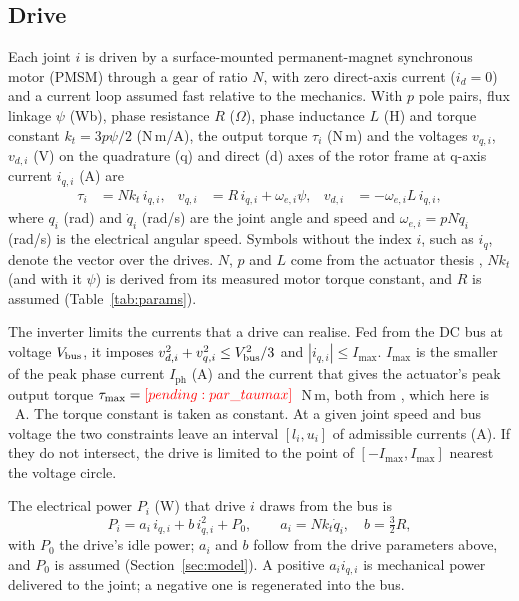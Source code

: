 \subsection{Drive}\label{sec:drive}
Each joint $i$ is driven by a surface-mounted permanent-magnet synchronous motor (PMSM) through a gear of ratio $N$, with zero direct-axis current ($i_d=0$) and a current loop assumed fast relative to the mechanics. With $p$ pole pairs, flux linkage $\psi$ (Wb), phase resistance $R$ ($\Omega$), phase inductance $L$ (H) and torque constant $k_t = 3p\psi/2$ (N\,m/A), the output torque $\tau_i$ (N\,m) and the voltages $v_{q,i}$, $v_{d,i}$ (V) on the quadrature (q) and direct (d) axes of the rotor frame at q-axis current $i_{q,i}$ (A) are
\begin{align}
\tau_i &= N k_t\, i_{q,i}, &
v_{q,i} &= R\, i_{q,i} + \omega_{e,i}\psi, &
v_{d,i} &= -\omega_{e,i} L\, i_{q,i},
\end{align}
where $q_i$ (rad) and $\dot q_i$ (rad/s) are the joint angle and speed and $\omega_{e,i} = pN\dot q_i$ (rad/s) is the electrical angular speed. Symbols without the index $i$, such as $i_q$, denote the vector over the drives. $N$, $p$ and $L$ come from the actuator thesis \cite{katz2018actuator}, $Nk_t$ (and with it $\psi$) is derived from its measured motor torque constant, and $R$ is assumed (Table~\ref{tab:params}).

The inverter limits the currents that a drive can realise. Fed from the DC bus at voltage $V_{\mathrm{bus}}$, it imposes $v_{d,i}^2+v_{q,i}^2 \le V_{\mathrm{bus}}^2/3$ and $|i_{q,i}|\le I_{\max}$. $I_{\max}$ is the smaller of the peak phase current $I_{\mathrm{ph}}$ (A) and the current that gives the actuator's peak output torque $\tau_{\max}=\res{par_taumax}$~N\,m, both from \cite{katz2018actuator}, which here is ~A. The torque constant is taken as constant. At a given joint speed and bus voltage the two constraints leave an interval $[l_i,u_i]$ of admissible currents (A). If they do not intersect, the drive is limited to the point of $[-I_{\max},I_{\max}]$ nearest the voltage circle.

The electrical power $P_i$ (W) that drive $i$ draws from the bus is
\begin{equation}
P_i = a_i\, i_{q,i} + b\, i_{q,i}^2 + P_0, \qquad a_i = N k_t \dot q_i,\quad b = \tfrac{3}{2}R ,
\label{eq:power}
\end{equation}
with $P_0$ the drive's idle power; $a_i$ and $b$ follow from the drive parameters above, and $P_0$ is assumed (Section~\ref{sec:model}). A positive $a_i i_{q,i}$ is mechanical power delivered to the joint; a negative one is regenerated into the bus.

